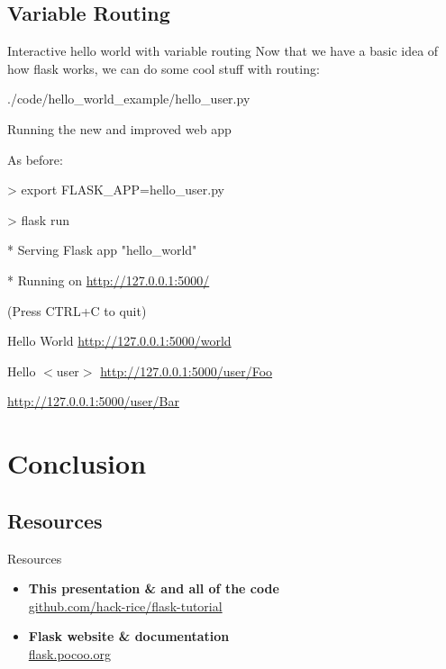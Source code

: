 \documentclass{beamer}
\begin{document}
\subsection{Variable Routing}
	\begin{frame}[t]{Interactive hello world with variable routing}
		Now that we have a basic idea of how flask works, we can do some cool
		stuff with routing:
		\begin{block}{./code/hello\_world\_example/hello\_user.py}
			
		\end{block}
	\end{frame}

	\begin{frame}[t]{Running the new and improved web app}
		\begin{block}{As before:}
			\begin{semiverbatim}
				> export FLASK\_APP=hello\_user.py

				> flask run

				* Serving Flask app "hello\_world"

				* Running on \url{http://127.0.0.1:5000/}

					(Press CTRL+C to quit)
			\end{semiverbatim}
		\end{block}

		\begin{block}{Hello World}
			\url{http://127.0.0.1:5000/world}
		\end{block}
		\begin{block}{Hello $<$user$>$}
			\url{http://127.0.0.1:5000/user/Foo}

			\url{http://127.0.0.1:5000/user/Bar}
		\end{block}
	\end{frame}


\section{Conclusion}

\subsection{Resources}
	\begin{frame}[t]{Resources}
		\begin{itemize}
			\item{
				\textbf{This presentation \& and all of the code}\\
				\indent \url{github.com/hack-rice/flask-tutorial}
			}
			\item{
				\textbf{Flask website \& documentation}\\
				\indent \url{flask.pocoo.org}
			}
		\end{itemize}
	\end{frame}
\end{document}
